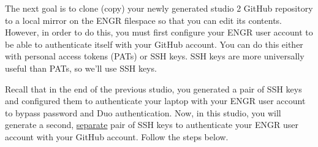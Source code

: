 \documentclass{article}
\begin{document}
The next goal is to clone (copy) your newly generated studio 2 GitHub repository to a local mirror on the ENGR filespace so that you can edit its contents. However, in order to do this, you must first configure your ENGR user account to be able to authenticate itself with your GitHub account. You can do this either with personal access tokens (PATs) or SSH keys. SSH keys are more universally useful than PATs, so we'll use SSH keys.

Recall that in the end of the previous studio, you generated a pair of SSH keys and configured them to authenticate your laptop with your ENGR user account to bypass password and Duo authentication. Now, in this studio, you will generate a second, \ul{separate} pair of SSH keys to authenticate your ENGR user account with your GitHub account. Follow the steps below.
\end{document}
